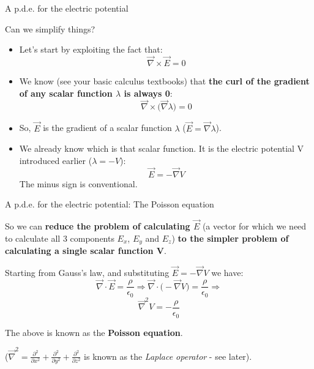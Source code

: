 %
%
%

\begin{frame}{A p.d.e. for the electric potential}

Can we simplify things?

\begin{itemize}
  \item Let's start by exploiting the fact that:
        \begin{equation*}
           \vec{\nabla} \times \vec{E} = 0
        \end{equation*}
  \item We know (see your basic calculus textbooks)
        that {\bf the curl of the gradient of any scalar function $\lambda$ is always 0}:
        \begin{equation*}
           \vec{\nabla} \times \Big( \vec{\nabla} \lambda \Big) = 0
        \end{equation*}
  \item So, $\vec{E}$ is the gradient of a scalar function $\lambda$ ($\vec{E} = \vec{\nabla} \lambda$).
  \item We already know which is that scalar function.
        It is the electric potential V introduced earlier ($\lambda = -V$):
        \begin{equation*}
           \vec{E} = - \vec{\nabla} V
        \end{equation*}
        The minus sign is conventional.
\end{itemize}

\end{frame}

%
%
%

\begin{frame}{A p.d.e. for the electric potential: The Poisson equation}

So we can {\bf reduce the problem of calculating $\vec{E}$}
(a vector for which we need to calculate all 3 components $E_x$, $E_y$ and $E_z$)
{\bf to the simpler problem of calculating a single scalar function V}.\\
\vspace{0.3cm}

Starting from Gauss's law, and substituting $\vec{E} = - \vec{\nabla} V$ we have:
\begin{equation*}
  \vec{\nabla} \cdot \vec{E} = \frac{\rho}{\epsilon_0} \Rightarrow
  \vec{\nabla} \cdot \Big( - \vec{\nabla} V \Big) = \frac{\rho}{\epsilon_0} \Rightarrow
\end{equation*}
\begin{equation*}
  \vec{\nabla}^{2} V = - \frac{\rho}{\epsilon_0}
\end{equation*}

The above is known as the {\bf Poisson equation}.\\
\vspace{0.3cm}

($\vec{\nabla}^{2} = \frac{\partial^2}{\partial x^2} + \frac{\partial^2}{\partial y^2} + \frac{\partial^2}{\partial z^2}$
is known as the {\em Laplace operator} - see later).

\end{frame}

